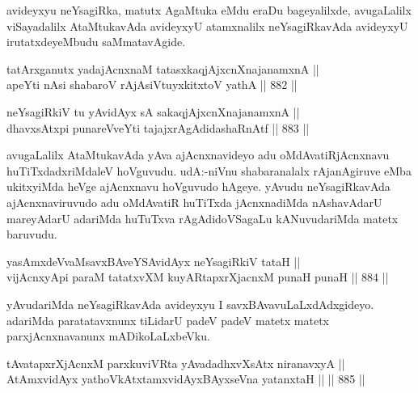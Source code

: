 \begin{artha}
avideyxyu neYsagiRka, matutx AgaMtuka eMdu eraDu bageyalilxde, avugaLalilx viSayadalilx AtaMtukavAda avideyxyU atamxnalilx neYsagiRkavAda avideyxyU irutatxdeyeMbudu saMmatavAgide.
\end{artha}


\begin{shl}
tatArx\s \s ganutx yadajAcnxnaM tatasxkaqjAjxcnXnajanamxnA || \\
apeYti nAsi shabaroV rAjA\s siVtuyxkitxtoV yathA \hfill || 882 ||  
\end{shl}
				
\begin{shl}
neYsagiRkiV tu yA\s vidAyx sA sakaqjAjxcnXnajanamxnA || \\
dhavxsAtx\s pi punareVveYti tajajxrAgAdidashaRnAtf \hfill || 883 ||  
\end{shl}

\begin{artha}
avugaLalilx AtaMtukavAda yAva ajAcnxnavideyo adu oMdAvatiRjAcnxnavu huTiTxdadxriMdaleV hoVguvudu. udA:-niVnu shabaranalalx rAjanAgiruve eMba ukitxyiMda heVge ajAcnxnavu hoVguvudo hAgeye. yAvudu neYsagiRkavAda ajAcnxnaviruvudo adu oMdAvatiR huTiTxda jAcnxnadiMda nAshavAdarU mareyAdarU adariMda huTuTxva rAgAdidoVSagaLu kANuvudariMda matetx baruvudu.
\end{artha}


\begin{shl}
yasAmxdeVvaMsavxBAveYSA\s vidAyx neYsagiRkiV tataH || \\
vijAcnxyApi paraM tatatxvXM kuyARtapxrXjacnxM punaH punaH \hfill || 884 ||  
\end{shl}

\begin{artha}
yAvudariMda neYsagiRkavAda avideyxyu I savxBAvavuLaLxdAdxgideyo. adariMda paratatavxnunx tiLidarU padeV padeV matetx matetx parxjAcnxnavanunx mADikoLaLxbeVku.
\end{artha}


\begin{shl}
tAvatapxrXjAcnxM parxkuviVRta yAvadadhxvXsAtx niranavxyA || \\
AtAmxvidAyx yathoVkAtxtamxvidAyxBAyxseVna yatanxtaH ||  \hfill || 885 ||  
\end{shl}

